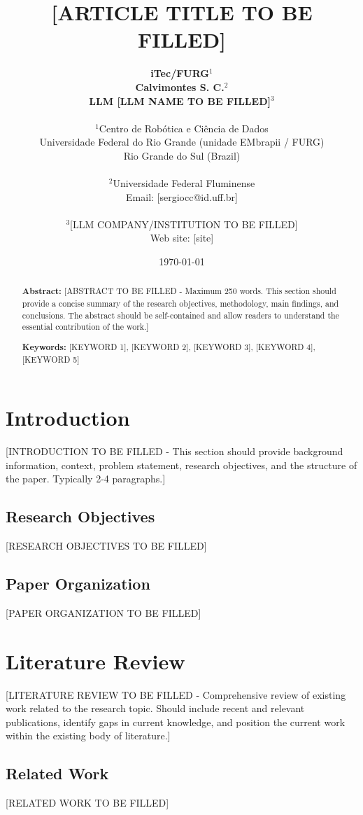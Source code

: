 \documentclass[11pt,a4paper]{article}
\title{\textbf{[ARTICLE TITLE TO BE FILLED]}}
\author{
	\textbf{iTec/FURG}$^{1}$ \\
	\textbf{Calvimontes S. C.}$^{2}$ \\
	\textbf{LLM [LLM NAME TO BE FILLED]}$^{3}$ \\
	\\
	\small $^{1}$Centro de Robótica e Ciência de Dados \\
	\small Universidade Federal do Rio Grande (unidade EMbrapii / FURG) \\
	\small Rio Grande do Sul (Brazil) \\
	\\
	\small $^{2}$Universidade Federal Fluminense \\
	\small Email: [sergiocc@id.uff.br] \\
	\\
	\small $^{3}$[LLM COMPANY/INSTITUTION TO BE FILLED] \\
	\small Web site: [site]
}
\date{\today}
\begin{document}
	
	\maketitle
	
	\begin{abstract}
		\textbf{Abstract:} [ABSTRACT TO BE FILLED - Maximum 250 words. This section should provide a concise summary of the research objectives, methodology, main findings, and conclusions. The abstract should be self-contained and allow readers to understand the essential contribution of the work.]
		
		\vspace{0.5cm}
		\noindent\textbf{Keywords:} [KEYWORD 1], [KEYWORD 2], [KEYWORD 3], [KEYWORD 4], [KEYWORD 5]
	\end{abstract}
	
	\newpage
	
	\section{Introduction}
	
	[INTRODUCTION TO BE FILLED - This section should provide background information, context, problem statement, research objectives, and the structure of the paper. Typically 2-4 paragraphs.]
		
	\subsection{Research Objectives}
	[RESEARCH OBJECTIVES TO BE FILLED]
	
	\subsection{Paper Organization}
	[PAPER ORGANIZATION TO BE FILLED]
	
	\section{Literature Review}
	
	[LITERATURE REVIEW TO BE FILLED - Comprehensive review of existing work related to the research topic. Should include recent and relevant publications, identify gaps in current knowledge, and position the current work within the existing body of literature.]
	
	\subsection{Related Work}
	[RELATED WORK TO BE FILLED]
	
\end{document}
